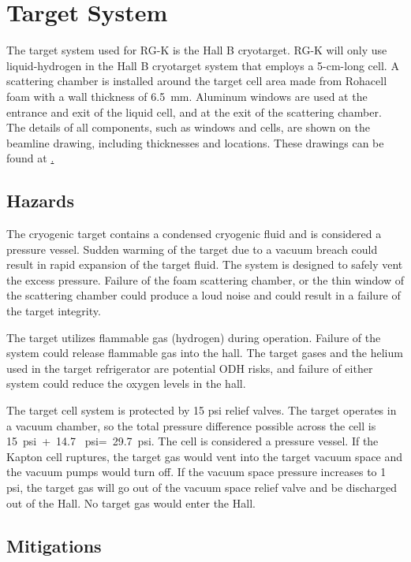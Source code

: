 \section{Target System}

The target system used for RG-K is the Hall B cryotarget. RG-K will only use liquid-hydrogen in the Hall B
cryotarget system that employs a 5-cm-long cell. A scattering chamber is installed around the target cell
area made from Rohacell foam with a wall thickness of 6.5~mm. Aluminum windows are used at the entrance and
exit of the liquid cell, and at the exit of the scattering chamber. The details of all components, such as
windows and cells, are shown on the beamline drawing, including thicknesses and locations. These drawings can
be found at \href{https://wiki.jlab.org/Hall-B/engineering/hallb_eng_wiki/index.php/Main_Page}.

\subsection{Hazards} 

The cryogenic target contains a condensed cryogenic fluid and is considered a pressure vessel. Sudden warming
of the target due to a vacuum breach could result in rapid expansion of the target fluid. The system is designed
to safely vent the excess pressure. Failure of the foam scattering chamber, or the thin window of the scattering
chamber could produce a loud noise and could result in a failure of the target integrity.

The target utilizes flammable gas (hydrogen) during operation. Failure of the system could release flammable gas
into the hall. The target gases and the helium used in the target refrigerator are potential ODH risks, and failure
of either system could reduce the oxygen levels in the hall.

The target cell system is protected by 15 psi relief valves. The target operates in a vacuum chamber, so the total
pressure difference possible across the cell is 15~psi~+~14.7 ~psi=~29.7~psi. The cell is considered a pressure
vessel. If the Kapton cell ruptures, the target gas would vent into the target vacuum space and the vacuum pumps
would turn off. If the vacuum space pressure increases to 1 psi, the target gas will go out of the vacuum space
relief valve and be discharged out of the Hall. No target gas would enter the Hall.

\subsection{Mitigations}

